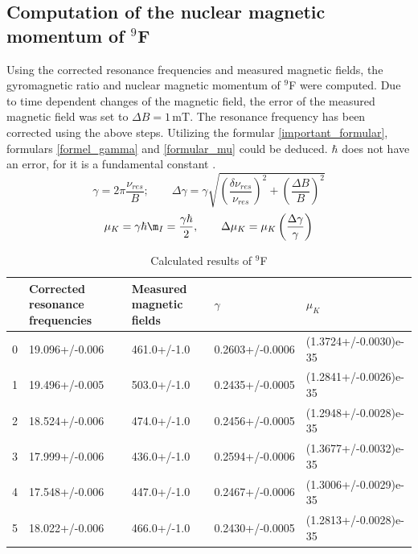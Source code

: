 \subsection{Computation of the nuclear magnetic momentum of $^9$F}
Using the corrected resonance frequencies and measured magnetic fields, the gyromagnetic ratio and nuclear magnetic momentum of $^9$F were computed. Due to time dependent changes of the magnetic field, the error of the measured magnetic field was set to $\Delta B = 1\,\text{mT}$. The resonance frequency has been corrected using the above steps. Utilizing the formular \ref{important_formular}, formulars \ref{formel_gamma} and \ref{formular_mu} could be deduced. $\hbar$ does not have an error, for it is a fundamental constant \cite{hbar}.
\begin{equation}
	\label{formel_gamma}
	\gamma = 2 \pi \frac{\nu_{res}}{B};\qquad \Delta\gamma = \gamma \sqrt{\left(\frac{\delta\nu_{res}}{\nu_{res}}\right)^2 + \left(\frac{\Delta B}{B}\right)^2}
\end{equation}
\begin{equation}
\label{formular_mu}
	\mu_K = \gamma\hbar\m_I = \frac{\gamma\hbar}{2}, \qquad \Delta \mu_K = \mu_K \left(\frac{\Delta \gamma}{\gamma}\right)
\end{equation}
\begin{table}[h]
	\caption{Calculated results of $^9$F}
	\label{teflon}
	\begin{tabular}{lllll}
		\toprule
		{} & Corrected resonance frequencies & Measured magnetic fields &           $\gamma$ &                $\mu_K$ \\
		\midrule
		0 &                  19.096+/-0.006 &              461.0+/-1.0 &  0.2603+/-0.0006 &  (1.3724+/-0.0030)e-35 \\
		1 &                  19.496+/-0.005 &              503.0+/-1.0 &  0.2435+/-0.0005 &  (1.2841+/-0.0026)e-35 \\
		2 &                  18.524+/-0.006 &              474.0+/-1.0 &  0.2456+/-0.0005 &  (1.2948+/-0.0028)e-35 \\
		3 &                  17.999+/-0.006 &              436.0+/-1.0 &  0.2594+/-0.0006 &  (1.3677+/-0.0032)e-35 \\
		4 &                  17.548+/-0.006 &              447.0+/-1.0 &  0.2467+/-0.0006 &  (1.3006+/-0.0029)e-35 \\
		5 &                  18.022+/-0.006 &              466.0+/-1.0 &  0.2430+/-0.0005 &  (1.2813+/-0.0028)e-35 \\
		\bottomrule
	\end{tabular}

\end{table}
